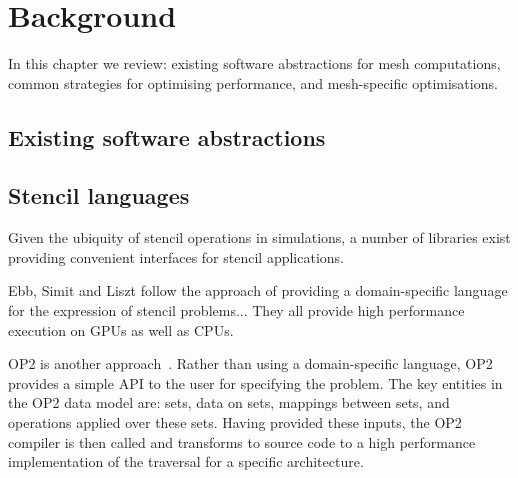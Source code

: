 \section{Background}

In this chapter we review: existing software abstractions for mesh computations, common strategies for optimising performance, and mesh-specific optimisations.

\subsection{Existing software abstractions}

\subsection{Stencil languages}

Given the ubiquity of stencil operations in simulations, a number of libraries exist providing convenient interfaces for stencil applications.


Ebb, Simit and Liszt follow the approach of providing a domain-specific language for the expression of stencil problems...
They all provide high performance execution on GPUs as well as CPUs.


OP2 is another approach~\cite{mudaligeOP2ActiveLibrary2012,mudaligeDesignInitialPerformance2013}.
Rather than using a domain-specific language, OP2 provides a simple API to the user for specifying the problem.
The key entities in the OP2 data model are: sets, data on sets, mappings between sets, and operations applied over these sets.
Having provided these inputs, the OP2 compiler is then called and transforms to source code to a high performance implementation of the traversal for a specific architecture.



